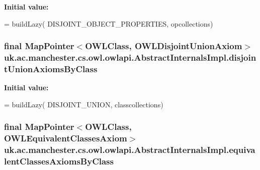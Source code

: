 {\bfseries Initial value\-:}
\begin{DoxyCode}
= buildLazy(
            DISJOINT\_OBJECT\_PROPERTIES, opcollections)
\end{DoxyCode}
\hypertarget{classuk_1_1ac_1_1manchester_1_1cs_1_1owl_1_1owlapi_1_1_abstract_internals_impl_a049f9d096742f72d1eb5f273f4ea3f47}{
\subsubsection[{disjoint\-Union\-Axioms\-By\-Class}]{\setlength{\rightskip}{0pt plus 5cm}final Map\-Pointer$<${\bf O\-W\-L\-Class}, {\bf O\-W\-L\-Disjoint\-Union\-Axiom}$>$ uk.\-ac.\-manchester.\-cs.\-owl.\-owlapi.\-Abstract\-Internals\-Impl.\-disjoint\-Union\-Axioms\-By\-Class\hspace{0.3cm}{\ttfamily [protected]}}}\label{classuk_1_1ac_1_1manchester_1_1cs_1_1owl_1_1owlapi_1_1_abstract_internals_impl_a049f9d096742f72d1eb5f273f4ea3f47}
{\bfseries Initial value\-:}
\begin{DoxyCode}
= buildLazy(
            DISJOINT\_UNION, classcollections)
\end{DoxyCode}
\hypertarget{classuk_1_1ac_1_1manchester_1_1cs_1_1owl_1_1owlapi_1_1_abstract_internals_impl_ae7dd0a945d910d6d2b789bb882b9dc46}{
\subsubsection[{equivalent\-Classes\-Axioms\-By\-Class}]{\setlength{\rightskip}{0pt plus 5cm}final Map\-Pointer$<${\bf O\-W\-L\-Class}, {\bf O\-W\-L\-Equivalent\-Classes\-Axiom}$>$ uk.\-ac.\-manchester.\-cs.\-owl.\-owlapi.\-Abstract\-Internals\-Impl.\-equivalent\-Classes\-Axioms\-By\-Class\hspace{0.3cm}{\ttfamily [protected]}}}\label{classuk_1_1ac_1_1manchester_1_1cs_1_1owl_1_1owlapi_1_1_abstract_internals_impl_ae7dd0a945d910d6d2b789bb882b9dc46}
